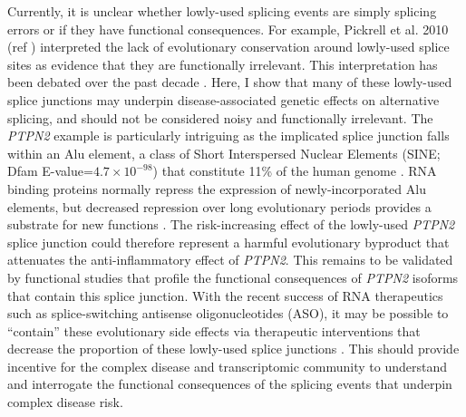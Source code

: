 Currently, it is unclear whether lowly-used splicing events are simply splicing errors \cite{Pickrell2010-lz,Melamud2009-my} or if they have functional consequences\cite{Wright2022-gp,Rotival2019-ic}. For example,  Pickrell et al. 2010 (ref \cite{Pickrell2010-lz}) interpreted the lack of evolutionary conservation around lowly-used splice sites as evidence that they are functionally irrelevant. This interpretation has been debated over the past decade \cite{Mazin2021-lb}. Here, I show that many of these lowly-used splice junctions may underpin disease-associated genetic effects on alternative splicing, and should not be considered noisy and functionally irrelevant. The \textit{PTPN2} example is particularly intriguing as the implicated splice junction falls within an Alu element, a class of Short Interspersed Nuclear Elements (SINE; Dfam E-value=$4.7\times10^{-98}$) that constitute 11\% of the human genome \cite{Deininger2011-cx}. RNA binding proteins normally repress the expression of newly-incorporated Alu elements, but decreased repression over long evolutionary periods provides a substrate for new functions \cite{Attig2016-mj,Singer2004-km}. The risk-increasing effect of the lowly-used \textit{PTPN2} splice junction could therefore represent a harmful evolutionary byproduct that attenuates the anti-inflammatory effect of \textit{PTPN2}. This remains to be validated by functional studies that profile the functional consequences of \textit{PTPN2} isoforms that contain this splice junction. With the recent success of RNA therapeutics such as splice-switching antisense oligonucleotides (ASO), it may be possible to “contain” these evolutionary side effects via therapeutic interventions that decrease the proportion of these lowly-used splice junctions \cite{Mercuri2018-pi,Roberts2020-rx}. This should provide incentive for the complex disease and transcriptomic community to understand and interrogate the functional consequences of the splicing events that underpin complex disease risk. \\

